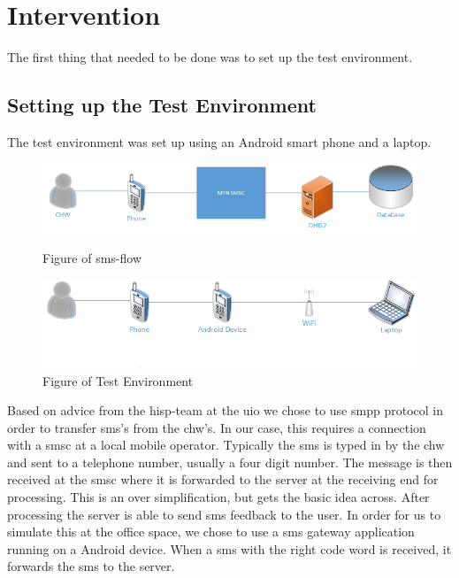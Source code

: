 \section{Intervention}
The first thing that needed to be done was to set up the test environment. 


\subsection{Setting up the Test Environment}
The test environment was set up using an Android smart phone and a laptop. 

\begin{figure}
\centering
\caption{Figure of \gls{sms}-flow}
\includegraphics[width=\textwidth]{case/img/smsFlow}
\label{fig:smsFlow} 
\end{figure} 

\begin{figure}
\centering
\includegraphics[width=\textwidth]{case/img/testEnvironment}
\caption{Figure of Test Environment}
\label{fig:testEnvironment} 
\end{figure}

Based on advice from the \gls{hisp}-team at the \gls{uio} we chose to use \gls{smpp} protocol in order to transfer \gls{sms}'s from the \gls{chw}'s. In our case, this requires a connection with a \gls{smsc} at a local mobile operator. Typically the \gls{sms} is typed in by the \gls{chw} and sent to a telephone number, usually a four digit number. The message is then received at the \gls{smsc} where it is forwarded to the server at the receiving end for processing. This is an over simplification, but gets the basic idea across. After processing the server is able to send \gls{sms} feedback to the user. In order for us to simulate this at the office space, we chose to use a \gls{sms} gateway application running on a Android device. When a \gls{sms} with the right code word is received, it forwards the \gls{sms} to the server. 

